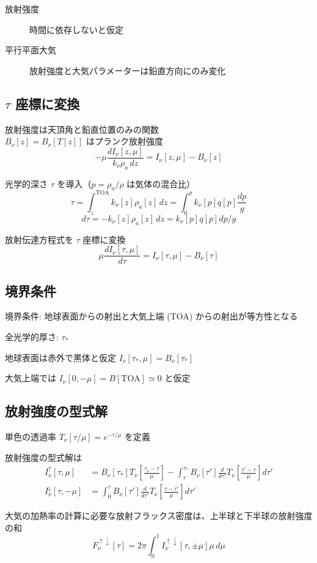 \documentclass[article,nontitlepage,]{dennou777}
\begin{document}
\begin{description}
	\item[放射強度] 時間に依存しないと仮定
	\item[平行平面大気] 放射強度と大気パラメーターは鉛直方向にのみ変化
\end{description}

\subsection{$\tau$ 座標に変換}
放射強度は天頂角と鉛直位置のみの関数\\
$B_\nu[z]=B_\nu[T[z]]$ はプランク放射強度
\[-\mu\frac{dI_\nu[z,\mu]}{k_\nu\rho_a\,dz}=I_\nu[z,\mu]-B_\nu[z]\]

光学的深さ $\tau$ を導入（$p=\rho_a/\rho$ は気体の混合比）
\[\tau=\int^{\mathrm{TOA}}_{z} k_\nu[z]\rho_a[z]\,dz=\int^p_0 k_\nu[p]q[p]\frac{dp}{g}\]
\[d\tau=-k_\nu[z]\rho_a[z]\,dz=k_\nu[p]q[p]dp/g\]

放射伝達方程式を $\tau$ 座標に変換
\[\mu\frac{dI_\nu[\tau,\mu]}{d\tau}=I_\nu[\tau,\mu]-B_\nu[\tau]\]

\subsection{境界条件}
境界条件: 地球表面からの射出と大気上端 (TOA) からの射出が等方性となる

全光学的厚さ: $\tau_*$

地球表面は赤外で黒体と仮定 $I_\nu[\tau_*,\mu]=B_\nu[\tau_*]$

大気上端では $I_\nu[0,-\mu]=B[\mathrm{TOA}]\simeq0$ と仮定

\subsection{放射強度の型式解}
単色の透過率 $T_\nu[\tau/\mu]=e^{-\tau/\mu}$ を定義

放射強度の型式解は
\begin{align*}
	I^\uparrow_\nu[\tau,\mu]
		&=B_\nu[\tau_*]T_\nu\left[\frac{\tau_\nu-\tau}{\mu}\right]
		-\int^{\tau_*}_\tau B_\nu[\tau']\frac{d}{d\tau'}T_\nu\left[\frac{\tau'-\tau}{\mu}\right]d\tau'\\
	I^\downarrow_\nu[\tau,-\mu]
		&=\int^\tau_0 B_\nu[\tau']\frac{d}{d\tau'}T_\nu\left[\frac{\tau-\tau'}{\mu}\right]d\tau'
\end{align*}

大気の加熱率の計算に必要な放射フラックス密度は、上半球と下半球の放射強度の和
\[F^{\uparrow\downarrow}_\nu[\tau]=2\pi\int^1_0 I^{\uparrow\downarrow}_\nu[\tau,\pm\mu]\mu\,d\mu\]
\end{document}
